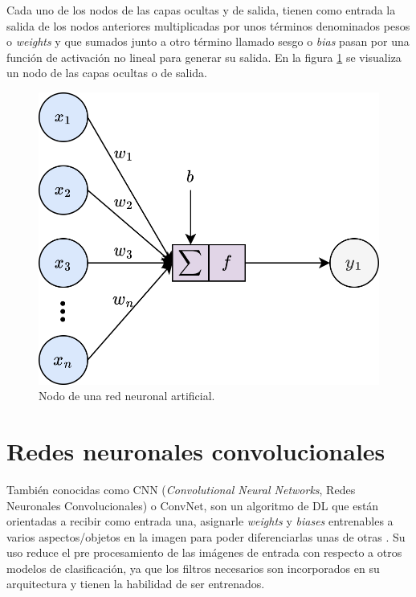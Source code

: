 Cada uno de los nodos de las capas ocultas y de salida, tienen como entrada la salida de los nodos anteriores multiplicadas por unos términos denominados pesos o \textit{weights} y que sumados junto a otro término llamado sesgo o \textit{bias} pasan por una función de activación no lineal para generar su salida. En la figura \ref{fig:dl_node} se visualiza un nodo de las capas ocultas o de salida.
\begin{figure}[h]
	\centering
	\includegraphics[scale=0.25]{./Figures/dl_node.png}
	\caption{Nodo de una red neuronal artificial.}
	\label{fig:dl_node}
\end{figure}

\section{Redes neuronales convolucionales}
También conocidas como CNN (\textit{Convolutional Neural Networks}, Redes Neuronales Convolucionales) o ConvNet, son un algoritmo de DL que están orientadas a recibir como entrada una, asignarle \textit{weights} y \textit{biases} entrenables a varios aspectos/objetos en la imagen para poder diferenciarlas unas de otras \cite{cnn_def}. Su uso reduce el pre procesamiento de las imágenes de entrada con respecto a otros modelos de clasificación, ya que los filtros necesarios son incorporados en su arquitectura y tienen la habilidad de ser entrenados.

